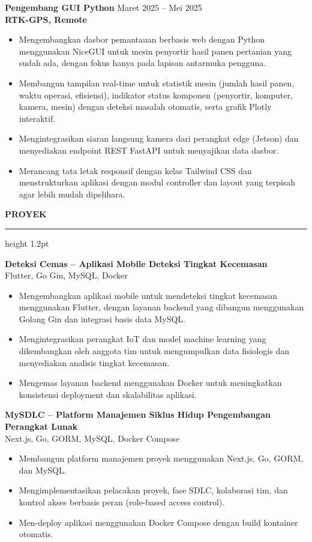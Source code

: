 \documentclass[11pt,a4paper]{article}
\newcommand{\secfontsize}{14}
\newcommand{\seclineheight}{1.2pt}
\newcommand{\secgapabove}{14pt}
\newcommand{\secgaptitle}{6pt}
\newcommand{\secgapbelow}{10pt}
\newcommand{\company}[1]{\textbf{\textcolor{accent}{#1}}}
\newcommand{\cvsection}[1]{%
    \par\vspace{\secgapabove}%
    {\fontsize{\secfontsize}{\numexpr\secfontsize+3\relax}\selectfont\bfseries\scshape #1}\par
    \vspace{\secgaptitle}%
    {\color{black}\hrule height \seclineheight}%
    \vspace{\secgapbelow}%
    \noindent\ignorespaces
}
\newcommand{\techstack}[1]{{\small\color{muted}#1}}
\begin{document}
\textbf{Pengembang GUI Python}
\hfill
Maret 2025 -- Mei 2025 \\
\company{RTK-GPS, Remote}
\begin{itemize}
\item Mengembangkan dasbor pemantauan berbasis web dengan Python menggunakan NiceGUI untuk mesin penyortir hasil panen pertanian yang sudah ada, dengan fokus hanya pada lapisan antarmuka pengguna.
\item Membangun tampilan real-time untuk statistik mesin (jumlah hasil panen, waktu operasi, efisiensi), indikator status komponen (penyortir, komputer, kamera, mesin) dengan deteksi masalah otomatis, serta grafik Plotly interaktif.
\item Mengintegrasikan siaran langsung kamera dari perangkat edge (Jetson) dan menyediakan endpoint REST FastAPI untuk menyajikan data dasbor.
\item Merancang tata letak responsif dengan kelas Tailwind CSS dan menstrukturkan aplikasi dengan modul controller dan layout yang terpisah agar lebih mudah dipelihara.
\end{itemize}

\vspace{8pt}

\cvsection{PROYEK}
\textbf{Deteksi Cemas -- Aplikasi Mobile Deteksi Tingkat Kecemasan}\\[2pt]
\techstack{Flutter, Go Gin, MySQL, Docker}
\begin{itemize}
\item Mengembangkan aplikasi mobile untuk mendeteksi tingkat kecemasan menggunakan Flutter, dengan layanan backend yang dibangun menggunakan Golang Gin dan integrasi basis data MySQL.
\item Mengintegrasikan perangkat IoT dan model machine learning yang dikembangkan oleh anggota tim untuk mengumpulkan data fisiologis dan menyediakan analisis tingkat kecemasan.
\item Mengemas layanan backend menggunakan Docker untuk meningkatkan konsistensi deployment dan skalabilitas aplikasi.
\end{itemize}

\vspace{4pt}

\textbf{MySDLC -- Platform Manajemen Siklus Hidup Pengembangan Perangkat Lunak}\\[2pt]
\techstack{Next.js, Go, GORM, MySQL, Docker Compose}
\begin{itemize}
\item Membangun platform manajemen proyek menggunakan Next.js, Go, GORM, dan MySQL.
\item Mengimplementasikan pelacakan proyek, fase SDLC, kolaborasi tim, dan kontrol akses berbasis peran (role-based access control).
\item Men-deploy aplikasi menggunakan Docker Compose dengan build kontainer otomatis.
\end{itemize}
\end{document}
